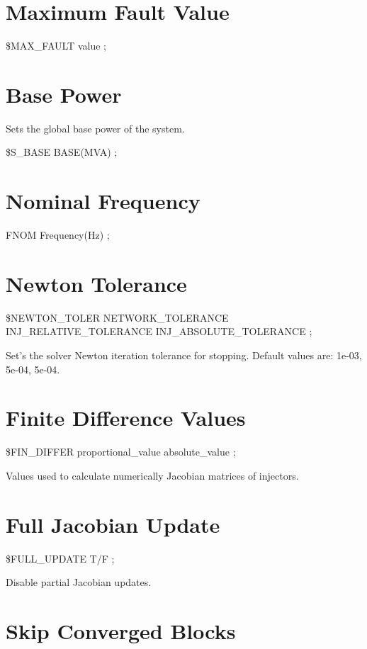 \section{Maximum Fault Value}

 \$MAX\_FAULT value ; 


\section{Base Power}

Sets the global base power of the system.

 \$S\_BASE BASE(MVA) ; 


\section{Nominal Frequency}

 FNOM Frequency(Hz) ; 


\section{Newton Tolerance}

 \$NEWTON\_TOLER NETWORK\_TOLERANCE INJ\_RELATIVE\_TOLERANCE
	INJ\_ABSOLUTE\_TOLERANCE ; 

Set's the solver Newton iteration tolerance for stopping. Default
values are: 1e-03, 5e-04, 5e-04.


\section{Finite Difference Values}

 \$FIN\_DIFFER proportional\_value absolute\_value
	; 

Values used to calculate numerically Jacobian matrices of injectors.


\section{Full Jacobian Update}

 \$FULL\_UPDATE T/F ; 

Disable partial Jacobian updates.


\section{Skip Converged Blocks}

